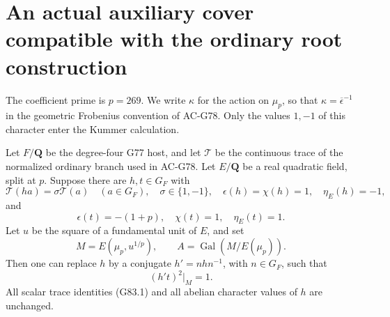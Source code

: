 \section{An actual auxiliary cover compatible with the ordinary root construction}
\label{sec:cubic-actual-tame-cover}

The coefficient prime is \(p=269\).  We write \(\kappa\) for
the action on \(\mu_p\), so that
\(\kappa=\overline\epsilon^{-1}\) in the geometric Frobenius
convention of AC-G78.  Only the values \(1,-1\) of this
character enter the Kummer calculation.

\begin{lemma}
\label{lem:G83-Kummer}
Let \(F/\mathbf Q\) be the degree-four G77 host, and let
\(\mathcal T\) be the continuous trace of the normalized
ordinary branch used in AC-G78.
Let \(E/\mathbf Q\) be a real quadratic field, split at \(p\).
Suppose there are \(h,t\in G_F\) with
\[
 \mathcal T(ha)=\sigma\mathcal T(a)\quad(a\in G_F),
 \quad \sigma\in\{1,-1\},\quad
 \epsilon(h)=\chi(h)=1,\quad \eta_E(h)=-1,
                                                        \tag{G83.1}
\]
and
\[
 \epsilon(t)=-(1+p),\quad \chi(t)=1,\quad\eta_E(t)=1.
                                                        \tag{G83.2}
\]
Let \(u\) be the square of a fundamental unit of \(E\), and set
\[
 M=E(\mu_p,u^{1/p}),\qquad
 A=\operatorname{Gal}(M/E(\mu_p)).
\]
Then one can replace \(h\) by a conjugate \(h'=nhn^{-1}\),
with \(n\in G_F\), such that
\[
                    (h't)^2|_M=1.                \tag{G83.3}
\]
All scalar trace identities (G83.1) and all abelian
character values of \(h\) are unchanged.
\end{lemma}


